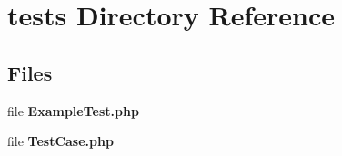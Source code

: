 \section{tests Directory Reference}
\label{dir_27780b7bc1f655c81b31a19465b5fc5b}
\subsection*{Files}
\begin{DoxyCompactItemize}
\item 
file {\bf Example\+Test.\+php}
\item 
file {\bf Test\+Case.\+php}
\end{DoxyCompactItemize}
